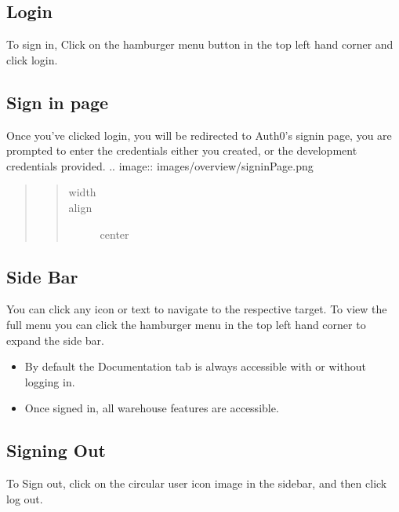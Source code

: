 \documentclass[letterpaper,10pt,english]{sphinxmanual}
\let\oldsubsection\subsection
\renewcommand{\subsection}{\needspace{6\baselineskip}\oldsubsection}
\begin{document}
\subsection{Login}
\label{\detokenize{docs/ui/overview:login}}
To sign in, Click on the hamburger menu button in the top left hand
corner and click login.


\subsection{Sign in page}
\label{\detokenize{docs/ui/overview:sign-in-page}}
Once you’ve clicked login, you will be redirected to Auth0’s signin
page, you are prompted to enter the credentials either you created, or
the development credentials provided.
.. image:: images/overview/signinPage.png
\begin{quote}
\begin{quote}\begin{description}
\item[{width}] 

\item[{align}] \leavevmode
center

\end{description}\end{quote}
\end{quote}


\subsection{Side Bar}
\label{\detokenize{docs/ui/overview:side-bar}}
You can click any icon or text to navigate to the respective target. To
view the full menu you can click the hamburger menu in the top left hand
corner to expand the side bar.
\begin{itemize}
\item {} 
By default the Documentation tab is always accessible with or without logging in.

\item {} 
Once signed in, all warehouse features are accessible.

\end{itemize}


\subsection{Signing Out}
\label{\detokenize{docs/ui/overview:signing-out}}
To Sign out, click on the circular user icon image in the sidebar, and
then click log out.
\end{document}
